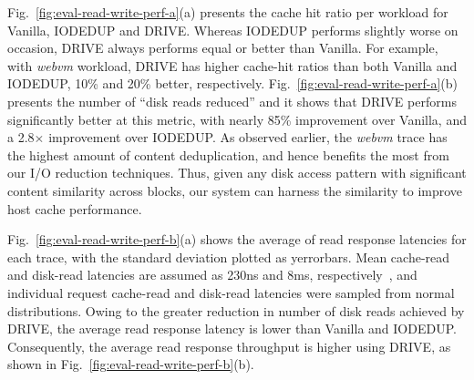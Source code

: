 Fig.~\ref{fig:eval-read-write-perf-a}(a) presents the cache hit ratio 
per workload for Vanilla, IODEDUP and DRIVE. 
Whereas IODEDUP performs slightly worse on 
occasion, DRIVE always performs equal or better than Vanilla.
For example, with \textit{webvm} workload, DRIVE has higher cache-hit
ratios than both Vanilla and IODEDUP, 10\% and 20\% better, respectively.
Fig.~\ref{fig:eval-read-write-perf-a}(b) presents the number of ``disk 
reads reduced'' and it shows that DRIVE performs significantly
better at this metric, with nearly 85\% improvement over Vanilla, and
a %
2.8$\times$ improvement over IODEDUP.
As observed earlier, the \textit{webvm} trace has the highest amount
of content deduplication, and hence benefits the most from our I/O 
reduction techniques. Thus, given any disk access pattern with
significant content similarity across blocks, our system can harness the
similarity to improve host cache performance.

Fig.~\ref{fig:eval-read-write-perf-b}(a) shows the average of read
response latencies for each trace, with the standard deviation plotted
as yerrorbars. Mean cache-read and disk-read latencies are assumed as
230ns and 8ms, respectively~\cite{gustavo-blogpost}, and individual request
cache-read and disk-read latencies were sampled from normal 
distributions.
Owing to the greater reduction in number of disk reads achieved by DRIVE, 
the average read response latency is lower than
Vanilla and IODEDUP. Consequently, the average read response throughput
is higher using DRIVE, as shown in Fig.~\ref{fig:eval-read-write-perf-b}(b).

